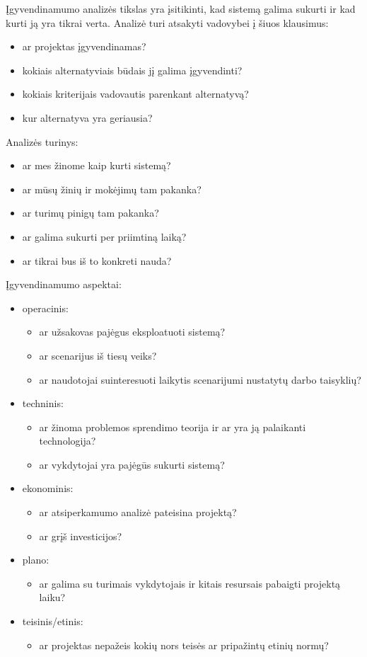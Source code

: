Įgyvendinamumo analizės tikslas yra įsitikinti, kad sistemą galima sukurti
ir kad kurti ją yra tikrai verta. Analizė turi atsakyti vadovybei
į šiuos klausimus:
\begin{itemize}
  \item ar projektas įgyvendinamas?
  \item kokiais alternatyviais būdais jį galima įgyvendinti?
  \item kokiais kriterijais vadovautis parenkant alternatyvą?
  \item kur alternatyva yra geriausia?
\end{itemize}
Analizės turinys:
\begin{itemize}
  \item ar mes žinome kaip kurti sistemą?
  \item ar mūsų žinių ir mokėjimų tam pakanka?
  \item ar turimų pinigų tam pakanka?
  \item ar galima sukurti per priimtiną laiką?
  \item ar tikrai bus iš to konkreti nauda?
\end{itemize}
Įgyvendinamumo aspektai:
\begin{itemize}
  \item operacinis:
    \begin{itemize}
      \item ar užsakovas pajėgus eksploatuoti sistemą?
      \item ar scenarijus iš tiesų veiks?
      \item ar naudotojai suinteresuoti laikytis scenarijumi nustatytų
        darbo taisyklių?
    \end{itemize}
  \item techninis:
    \begin{itemize}
      \item ar žinoma problemos sprendimo teorija ir ar yra ją palaikanti
        technologija?
      \item ar vykdytojai yra pajėgūs sukurti sistemą?
    \end{itemize}
  \item ekonominis:
    \begin{itemize}
      \item ar atsiperkamumo analizė pateisina projektą?
      \item ar grįš investicijos?
    \end{itemize}
  \item plano:
    \begin{itemize}
      \item ar galima su turimais vykdytojais ir kitais resursais
        pabaigti projektą laiku?
    \end{itemize}
  \item teisinis/etinis:
    \begin{itemize}
      \item ar projektas nepažeis kokių nors teisės ar pripažintų etinių
        normų?
    \end{itemize}
\end{itemize}
